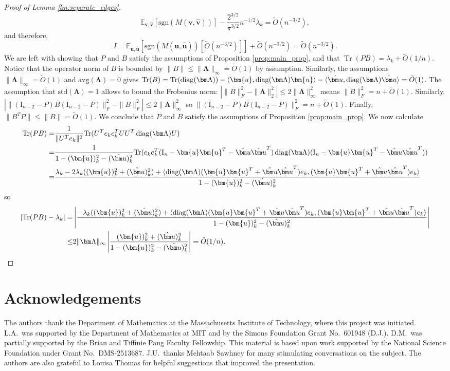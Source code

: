 \documentclass[reqno]{amsart}
\numberwithin{equation}{section}
\newcommand\E{\mathbb{E}}
\newcommand\rem{\tilde{O}\left(n^{-3/2}\right)}
\newcommand\bu{\bm{u}}
\newcommand\hu{\hat{\bm u}}
\newcommand\bv{\bm{v}}
\newcommand\hv{\hat{\bm v}}
\newcommand\Tr{{\operatorname{Tr}}}
\newcommand{\diag}{\mathop {\rm diag}}
\newcommand{\av}{\mathrm{avg}}
\newcommand{\std}{\mathrm{std}}
\begin{document}
\begin{proof}[Proof of Lemma \ref{lm:separate_edges}]
\[\E_{\bv,\hv}\left[\mathrm{sgn}\left(M(\bv,\hv)\right)\right]-\frac{2^{3/2}}{\pi^{3/2}}n^{-1/2}\lambda_{k}=\rem,\]
and therefore,
\[I=\E_{\bu,\hu}\left[\mathrm{sgn}\left(M(\bu,\hu)\right)\left[\rem\right]\right]+\rem=\rem.\]
We are left with showing that $P$ and $B$ satisfy the assumptions of Proposition \ref{prop:main_prop}, and that $\Tr(PB)=\lambda_k+\tilde{O}(1/n)$. Notice that the operator norm of $B$ is bounded by $\|B\|\le \|\bm\Lambda\|_{\infty}=\tilde{O}(1)$ by assumption. Similarly, the assumptions $\|\bm\Lambda\|_{\infty}=\tilde{O}(1)$ and $\av(\bm\Lambda)=0$ gives $\Tr(B)=\Tr(\diag(\bm\Lambda))-\langle\bu,\diag(\bm\Lambda)\bu\rangle-\langle\hu,\diag(\bm\Lambda)\hu\rangle=\tilde{O}(1)$. The assumption that $ \std(\bm\Lambda)=1$ allows to bound the Frobenius norm: 
$\left|\|B\|_{F}^2-\|\bm\Lambda\|_{2}^2\right|\le 2\|\bm\Lambda\|_{\infty}^2$ means $\|B\|_{F}^2=n+\tilde{O}(1)$. Similarly, $\left|\|(\mathrm{I}_{n-2}-P)B(\mathrm{I}_{n-2}-P)\|_{F}^2-\|B\|_{F}^2\right|\le 2\|\bm\Lambda\|_{\infty}^2$ so $\|(\mathrm{I}_{n-2}-P)B(\mathrm{I}_{n-2}-P)\|_{F}^2=n+\tilde{O}(1)$. Finally, $\|B^{T}P\|\le\|B\|=\tilde{O}(1)$. We conclude that $P$ and $B$ satisfy the assumptions of Proposition \ref{prop:main_prop}. We now calculate 
\begin{align*}
 \Tr(PB)= & \frac{1}{\|U^{T}e_k\|^2}\Tr(U^Te_{k}e_{k}^{T}UU^T\diag(\bm\Lambda)U)\\
    = & \frac{1}{1-(\bu)_k^2-(\hu)_k^2}\Tr(e_{k}e_{k}^{T}(\mathrm{I}_n-\bu\bu^T-\hu\hu^{T})\diag(\bm\Lambda)(\mathrm{I}_n-\bu\bu^T-\hu\hu^{T}))\\
    = & \frac{
\lambda_{k}-2\lambda_k((\bu)_k^2+(\hu)_k^2)+\langle\diag(\bm\Lambda)(\bu\bu^T+\hu\hu^{T})e_{k},(\bu\bu^T+\hu\hu^{T})e_{k}\rangle
    }{1-(\bu)_k^2-(\hu)_k^2}
\end{align*}
so
\begin{align*}
    \left|\Tr(PB)-\lambda_k\right|= & \left|\frac{
-\lambda_k((\bu)_k^2+(\hu)_k^2)+\langle\diag(\bm\Lambda)(\bu\bu^T+\hu\hu^{T})e_{k},(\bu\bu^T+\hu\hu^{T})e_{k}\rangle
    }{1-(\bu)_k^2-(\hu)_k^2}\right|\\   
     \le& 2\|\bm\Lambda\|_{\infty}\left|\frac{
(\bu)_k^2+(\hu)_k^2}{1-(\bu)_k^2-(\hu)_k^2}\right|=\tilde{O}(1/n).
\end{align*}
\end{proof}
\section*{Acknowledgements}
The authors thank the Department of Mathematics at the Massachusetts Institute of Technology, where this project was initiated.
L.A.\ was supported by the Department of Mathematics at MIT and by the Simons Foundation Grant No.~601948 (D.J.).
D.M.\ was partially supported by the Brian and Tiffinie Pang Faculty Fellowship.
This material is based upon work supported by the National Science Foundation under Grant No.~DMS-2513687.
J.U.\ thanks Mehtaab Sawhney for many stimulating conversations on the subject.
The authors are also grateful to Louisa Thomas for helpful suggestions that improved the presentation.

{ \small 
	
	 }



\clearpage
{}
	
\end{document}
